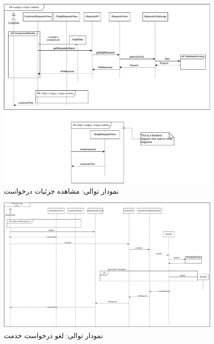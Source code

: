\begin{figure}[ht!]
	\centering
	\includegraphics[scale=0.8]{figs/design-sequence/3-11.pdf}
	\caption{نمودار توالی: مشاهده جزئیات درخواست}
\end{figure}
\FloatBarrier
\newpage

\eject \pdfpagewidth=15in \pdfpageheight=12in

\begin{figure}[ht!]
	\centering
	\includegraphics[scale=0.8]{figs/design-sequence/3-16.pdf}
	\caption{نمودار توالی: لغو درخواست خدمت}
\end{figure}
\FloatBarrier
\newpage


\eject \pdfpagewidth=12in \pdfpageheight=8in

